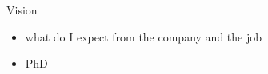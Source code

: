 \begin{frame}{Vision}
%
  \begin{itemize}\itemfill
    \item what do I expect from the company and the job
    \item PhD
  \end{itemize}
%
\end{frame}

